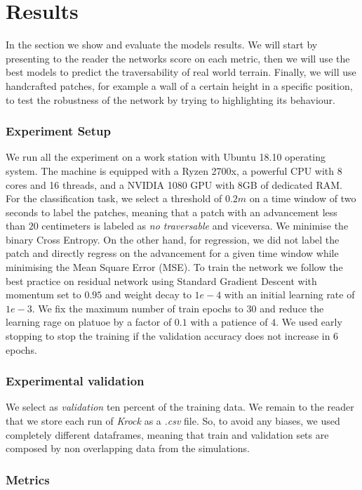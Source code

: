 \documentclass[../document.tex]{subfiles}
\begin{document}
\section{Results}
In the section we show and evaluate the models results. We will start by presenting to the reader the networks score on each metric, then we will use the best models to predict the traversability of real world terrain. Finally, we will use handcrafted patches, for example a wall of a certain height in a specific position, to test the robustness of the network by trying to highlighting its behaviour.
\subsubsection{Experiment Setup}
We run all the experiment on a work station with Ubuntu 18.10 operating system. The machine is equipped with a Ryzen 2700x, a powerful CPU with 8 cores and 16 threads, and a NVIDIA 1080 GPU with 8GB of dedicated RAM.
For the classification task, we select a threshold of $0.2m$ on a time window of two seconds to label the patches, meaning that a patch with an advancement less than $20$ centimeters is labeled as \emph{no traversable} and viceversa. We minimise the binary Cross Entropy.
On the other hand, for regression, we did not label the patch and directly regress on the advancement for a given time window while minimising the Mean Square Error (MSE). 
To train the network we follow the best practice on residual network \cite{he2015deep} using Standard Gradient Descent with momentum set to $0.95$ and weight decay to $1e-4$ with an initial learning rate of $1e-3$.
We fix the maximum number of train epochs to $30$ and reduce the learning rage on platuoe  by a factor of $0.1$ with a patience of $4$. We used early stopping to stop the training if the validation accuracy does not increase in $6$ epochs.
\subsubsection{Experimental validation}
We select as \emph{validation} ten percent of the training data. We remain to the reader that we store each run of \emph{Krock} as a \emph{.csv} file. So, to avoid any biases, we used completely different dataframes, meaning that train and validation sets are composed by non overlapping data from the simulations.
\subsubsection{Metrics}
\end{document}
